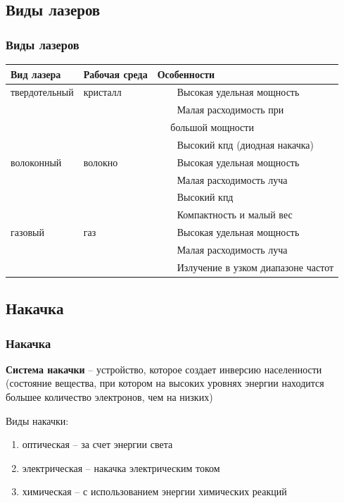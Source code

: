 \documentclass[10pt,pdf,hyperref={unicode}, dvipsnames]{beamer}
\newcommand\frametitless[1]{\subsection{#1}\frametitle{#1}}
\newcommand{\tabitem}{~~\llap{\textbullet}~~}
\begin{document}
\begin{frame}[t]
	\frametitless{Виды лазеров}
	\vfill
  \begin{tabular}{*{3}{l}}
    \toprule
    Вид лазера & Рабочая среда & Особенности \\
    \midrule
    твердотельный & кристалл & \tabitem Высокая удельная мощность \\
    	&&\tabitem Малая расходимость при\\
    	&&$\quad$ большой мощности\\
		&&\tabitem Высокий кпд (диодная накачка)\\
    \midrule

    волоконный & волокно & \tabitem Высокая удельная мощность \\
    	&&\tabitem Малая расходимость луча\\
		&&\tabitem Высокий кпд \\		
		&&\tabitem Компактность и малый вес \\		
    \midrule

    газовый & газ & \tabitem Высокая удельная мощность \\
    	&&\tabitem Малая расходимость луча\\
		&&\tabitem Излучение в узком диапазоне частот \\		
    \bottomrule
  \end{tabular}
\vfill
\end{frame}
\begin{frame}[t]
	\frametitless{Накачка}
	\textbf{Система накачки} -- устройство, которое создает инверсию населенности (состояние вещества, при  котором на высоких уровнях энергии находится большее количество электронов, чем на низких)


	Виды накачки: 
	\begin{enumerate}
		\item оптическая – за счет энергии света
		\item электрическая – накачка электрическим током
		\item химическая – с использованием энергии химических реакций
	\end{enumerate}
\end{frame}
\end{document}

